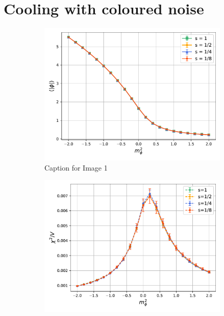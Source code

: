 \newpage

\section{Cooling with coloured noise}


\begin{figure}
    \centering
    \begin{subfigure}[b]{0.45\textwidth}
        \includegraphics[width=\textwidth]{figures/cooling/mass_scan/magnetisation.pdf}
        \caption{Caption for Image 1}
    \end{subfigure}
    \hfill
    \begin{subfigure}[b]{0.45\textwidth}
        \includegraphics[width=\textwidth]{figures/cooling/mass_scan/susceptibility.pdf}

\end{subfigure}
\end{figure}
